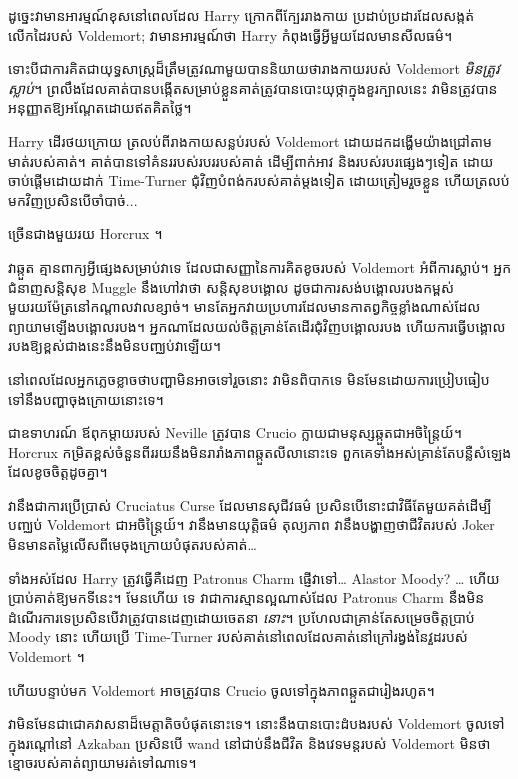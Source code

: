{ដូច្នេះវាមានអារម្មណ៍ខុសនៅពេលដែល Harry ក្រោកពីក្បែររាងកាយ ប្រដាប់ប្រដារដែលសង្កត់លើកដៃរបស់ Voldemort; វា​មាន​អារម្មណ៍​ថា Harry កំពុង​ធ្វើ​អ្វី​មួយ​ដែល​មាន​សីលធម៌។

ទោះបីជាការគិតជាយុទ្ធសាស្ត្រដ៏ត្រឹមត្រូវណាមួយបាននិយាយថារាងកាយរបស់ Voldemort \emph{មិនត្រូវស្លាប់}។ ព្រលឹង​ដែល​គាត់​បាន​បង្កើត​សម្រាប់​ខ្លួន​គាត់​ត្រូវ​បាន​បោះ​យុថ្កា​ក្នុង​ខួរក្បាល​នេះ វា​មិន​ត្រូវ​បាន​អនុញ្ញាត​ឱ្យ​អណ្តែត​ដោយ​ឥត​គិត​ថ្លៃ។

Harry ដើរថយក្រោយ ត្រលប់ពីរាងកាយសន្លប់របស់ Voldemort ដោយដកដង្ហើមយ៉ាងជ្រៅតាមមាត់របស់គាត់។ គាត់បានទៅគំនររបស់របររបស់គាត់ ដើម្បីពាក់អាវ និងរបស់របរផ្សេងៗទៀត ដោយចាប់ផ្តើមដោយដាក់ Time-Turner ជុំវិញបំពង់ករបស់គាត់ម្តងទៀត ដោយត្រៀមរួចខ្លួន ហើយត្រលប់មកវិញប្រសិនបើចាំបាច់...

ច្រើនជាងមួយរយ Horcrux ។

វាឆ្កួត គ្មានពាក្យអ្វីផ្សេងសម្រាប់វាទេ ដែលជាសញ្ញានៃការគិតខូចរបស់ Voldemort អំពីការស្លាប់។ អ្នកជំនាញសន្តិសុខ Muggle នឹងហៅវាថា សន្តិសុខបង្គោល ដូចជាការសង់បង្គោលរបងកម្ពស់មួយរយម៉ែត្រនៅកណ្តាលវាលខ្សាច់។ មាន​តែ​អ្នក​វាយប្រហារ​ដែល​មាន​កាតព្វកិច្ច​ខ្លាំង​ណាស់​ដែល​ព្យាយាម​ឡើង​បង្គោល​របង។ អ្នក​ណា​ដែល​យល់​ចិត្ត​គ្រាន់​តែ​ដើរ​ជុំវិញ​បង្គោល​របង ហើយ​ការ​ធ្វើ​បង្គោល​របង​ឱ្យ​ខ្ពស់​ជាង​នេះ​នឹង​មិន​បញ្ឈប់​វា​ឡើយ។

នៅពេលដែលអ្នកភ្លេចខ្លាចថាបញ្ហាមិនអាចទៅរួចនោះ វាមិនពិបាកទេ មិនមែនដោយការប្រៀបធៀបទៅនឹងបញ្ហាចុងក្រោយនោះទេ។

ជាឧទាហរណ៍ ឪពុកម្តាយរបស់ Neville ត្រូវបាន Crucio ក្លាយជាមនុស្សឆ្កួតជាអចិន្ត្រៃយ៍។ Horcrux កម្រិតខ្ពស់ចំនួនពីររយនឹងមិនរារាំងភាពឆ្កួតលីលានោះទេ ពួកគេទាំងអស់គ្រាន់តែបន្លឺសំឡេងដែលខូចចិត្តដូចគ្នា។

វា​នឹង​ជា​ការ​ប្រើ​ប្រាស់​ Cruciatus Curse ដែល​មាន​សុជីវធម៌ ប្រសិនបើ​នោះ​ជា​វិធី​តែ​មួយ​គត់​ដើម្បី​បញ្ឈប់ Voldemort ជា​អចិន្ត្រៃយ៍។ វា​នឹង​មាន​យុត្តិធម៌ តុល្យភាព វា​នឹង​បង្ហាញ​ថា​ជីវិត​របស់ Joker មិន​មាន​តម្លៃ​លើស​ពី​មេ​ចុង​ក្រោយ​បំផុត​របស់​គាត់…

ទាំងអស់ដែល Harry ត្រូវធ្វើគឺដេញ Patronus Charm ផ្ញើវាទៅ… Alastor Moody? … ហើយប្រាប់គាត់ឱ្យមកទីនេះ។ មែនហើយ ទេ វាជាការស្មានល្អណាស់ដែល Patronus Charm នឹងមិនដំណើរការទេប្រសិនបើវាត្រូវបានដេញដោយចេតនា \emph{នោះ}។ ប្រហែលជាគ្រាន់តែសម្រេចចិត្តប្រាប់ Moody នោះ ហើយប្រើ Time-Turner របស់គាត់នៅពេលដែលគាត់នៅក្រៅរង្វង់នៃវួដរបស់ Voldemort ។

ហើយបន្ទាប់មក Voldemort អាចត្រូវបាន Crucio ចូលទៅក្នុងភាពឆ្កួតជារៀងរហូត។

វា​មិន​មែន​ជា​ជោគ​វាសនា​ដ៏​មេត្តា​តិច​បំផុត​នោះ​ទេ។ នោះនឹងបានបោះដំបងរបស់ Voldemort ចូលទៅក្នុងរណ្តៅនៅ Azkaban ប្រសិនបើ wand នៅជាប់នឹងជីវិត និងវេទមន្តរបស់ Voldemort មិនថាខ្មោចរបស់គាត់ព្យាយាមរត់ទៅណាទេ។

}
